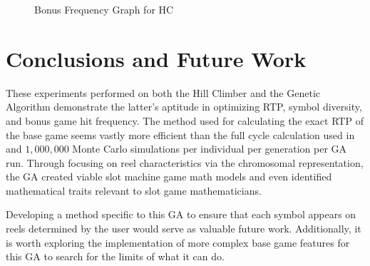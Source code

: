 \documentclass[conference]{IEEEtran}
\begin{document}
\begin{figure}[H]
	\centering
{}\datatable
{}
\caption{Bonus Frequency Graph for HC}\label{fig:bonusHC}
\end{figure}
\section{Conclusions and Future Work}
\label{conclusions}
These experiments performed on both the Hill Climber and the Genetic Algorithm demonstrate the latter's aptitude in optimizing RTP, symbol diversity, and bonus game hit frequency.
The method used for calculating the exact RTP of the base game seems vastly more efficient than the full cycle calculation used in \cite{keremedchiev2017slot} and $1,000,000$ Monte Carlo simulations per individual per generation per GA run.
Through focusing on reel characteristics via the chromosomal representation, the GA created viable slot machine game math models and even identified mathematical traits relevant to slot game mathematicians.
\par
Developing a method specific to this GA to ensure that each symbol appears on reels determined by the user would serve as valuable future work. Additionally, it is worth exploring the implementation of more complex base game features for this GA to search for the limits of what it can do.

\printbibliography[title={References}]
\end{document}
